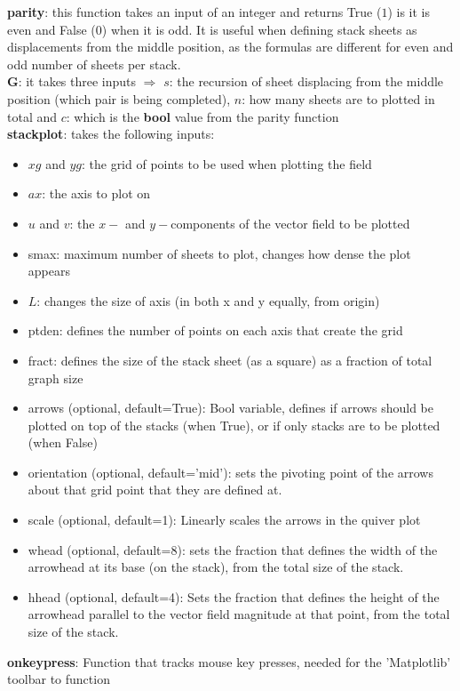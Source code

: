 \documentclass[11]{report}
\begin{document}
\textbf{parity}: this function takes an input of an integer and returns True ($1$) is it is even and False ($0$) when it is odd. It is useful when defining stack sheets as displacements from the middle position, as the formulas are different for even and odd number of sheets per stack.\\
\textbf{G}: it takes three inputs $\Rightarrow$ $s$: the recursion of sheet displacing from the middle position (which pair is being completed), $n$: how many sheets are to plotted in total and $c$: which is the \textbf{bool} value from the parity function\\
\textbf{stack\textunderscore plot}: takes the following inputs:
\begin{itemize}
	\item $xg$ and $yg$: the grid of points to be used when plotting the field
	\item $ax$: the axis to plot on
	\item $u$ and $v$: the $x-$ and $y-$components of the vector field to be plotted
	\item s\textunderscore max: maximum number of sheets to plot, changes how dense the plot appears
	\item $L$: changes the size of axis (in both x and y equally, from origin)
	\item pt\textunderscore den: defines the number of points on each axis that create the grid
	\item fract: defines the size of the stack sheet (as a square) as a fraction of total graph size
	\item arrows (optional, default=True): Bool variable, defines if arrows should be plotted on top of the stacks (when True), or if only stacks are to be plotted (when False)
	\item orientation (optional, default='mid'): sets the pivoting point of the arrows about that grid point that they are defined at.
	\item scale (optional, default=1): Linearly scales the arrows in the quiver plot
	\item w\textunderscore head (optional, default=8): sets the fraction that defines the width of the arrowhead at its base (on the stack), from the total size of the stack.
	\item h\textunderscore head (optional, default=4): Sets the fraction that defines the height of the arrowhead parallel to the vector field magnitude at that point, from the total size of the stack.
\end{itemize}
\textbf{on\textunderscore key\textunderscore press}: Function that tracks mouse key presses, needed for the 'Matplotlib' toolbar to function\\
\end{document}
